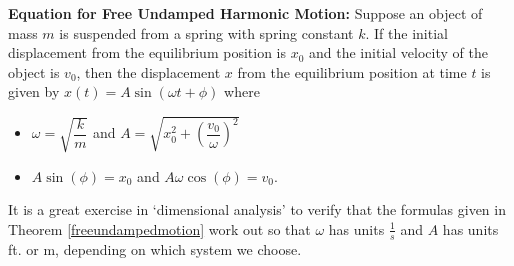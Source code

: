 \documentclass{ximera}
\begin{document}
\begin{theorem} \label{freeundampedmotion} \textbf{Equation for Free Undamped Harmonic Motion:}  Suppose an object of  mass $m$ is suspended from a spring with spring constant $k$.  If the initial displacement from the equilibrium position is $x_0$ and the initial velocity of the object is $v_0$, then the displacement $x$ from the equilibrium position at time $t$ is given by  $x(t) = A \sin(\omega t + \phi)$ where

\begin{itemize}

\item  $\omega = \sqrt{\dfrac{k}{m}}$ and $A = \sqrt{x_0^2 + \left( \dfrac{v_0}{\omega}\right)^2}$

\item $A\sin(\phi) = x_0$ and $A\omega\cos(\phi) = v_0$.

\end{itemize} 

\end{theorem}

 


 

It is a great exercise in `dimensional analysis' to verify that the formulas given in Theorem \ref{freeundampedmotion} work out so that $\omega$ has units $\frac{1}{s}$ and  $A$ has units ft. or m, depending on which system we choose.
\end{document}
